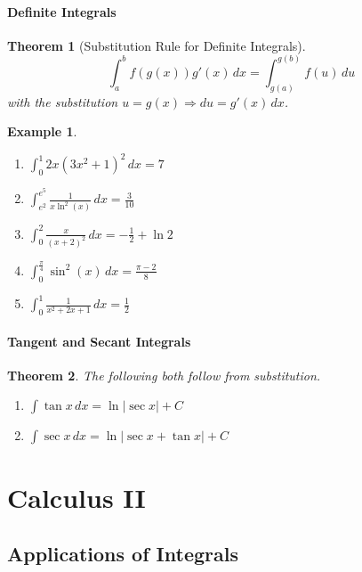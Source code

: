 \documentclass[letterpaper, 11pt, openany]{book}
\theoremstyle{mytheoremstyle}
\newtheorem{theorem}{Theorem}[section]
\theoremstyle{myexamplestyle}
\newtheorem{example}{Example}[section]
\begin{document}
\subsection{Definite Integrals}

\begin{theorem}[Substitution Rule for Definite Integrals]\label{t:sub-rule-def-int}
    \[\int_{a}^{b} f(g(x))g'(x)\, dx = \int_{g(a)}^{g(b)} f(u) \, du\]
    with the substitution \(u=g(x) \Rightarrow du = g'(x) \, dx\).
\end{theorem}

\begin{example}
    \begin{enumerate}
        \item \(\displaystyle \int_0^1 2 x \left(3 x^2+1\right)^2 \, dx = 7\)
        \item \(\displaystyle \int_{e^2}^{e^5} \frac{1}{x \ln^2(x)} \, dx = \frac{3}{10}\)
        \item \(\displaystyle \int_0^2 \frac{x}{(x+2)^2} \, dx = -\frac{1}{2} + \ln 2\)
        \item \(\displaystyle \int_0^{\frac{\pi }{4}} \sin ^2(x) \, dx = \frac{\pi -2}{8}\)
        \item \(\displaystyle \int_0^1 \frac{1}{x^2+2 x+1} \, dx  = \frac{1}{2}\)
    \end{enumerate}
\end{example}

\subsection{Tangent and Secant Integrals}
\begin{theorem}
    The following both follow from substitution.
    \begin{enumerate}
        \item \(\displaystyle \int \tan x \, dx = \ln |\sec x| + C\)
        \item \(\displaystyle \int \sec x \, dx = \ln |\sec x + \tan x| + C\)
    \end{enumerate}
\end{theorem}


\newpage
\part{Calculus II}
\thispagestyle{firstofchapter}
\chapter{Applications of Integrals}
\end{document}

